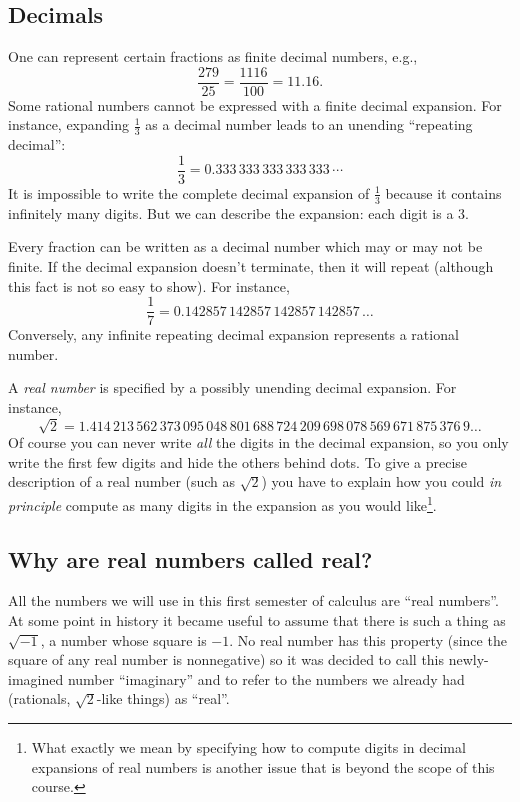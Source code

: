 \subsection{Decimals} 
One can represent certain fractions as finite decimal numbers, e.g.,
\[
\frac{279}{25}= \frac{1116}{100} = 11.16.
\]
Some rational numbers cannot be expressed with a finite decimal expansion.  For instance,
expanding $\frac13$ as a decimal number leads to an unending ``repeating decimal'':
\[
\frac13 = 0.333\,333\,333\,333\,333\,\cdots
\]
It is impossible to write the complete decimal expansion of $\frac13$
because it contains infinitely many digits.  But we can describe the
expansion: each digit is a 3.


Every fraction can be written as a decimal number which may or may
not be finite.  If the decimal expansion doesn't terminate, then it will
repeat (although this fact is not so easy to show).  For instance,
\[
\frac17 = 0.142857\,142857\,142857\,142857\,\dots
\]
Conversely, any infinite repeating decimal expansion represents a
rational number.


A \emph{real number} is specified by a possibly unending decimal
expansion.  For instance,
\[
\sqrt 2 = 1.414\,213\,562\,373\,095\,048\,801\,688\,724\,
209\,698\,078\,569\,671\,875\,376\,9\dots
\]
Of course you can never write \textit{all} the digits in the decimal expansion,
so you only write the first few digits and hide the others behind dots. To
give a precise description of a real number (such as $\sqrt2$) you have to
explain how you could \textit{in principle} compute as many digits in the
expansion as you would like\footnote{What exactly we mean by specifying how to compute digits in decimal expansions of real numbers is another issue that is beyond the scope of this course.}.


\subsection{Why are real numbers called real? } 
All the numbers we will use in this first semester of calculus are ``real
numbers''. At some point in history it became useful to assume that there
is such a thing as $\sqrt{-1}$, a number whose square is $-1$.  No
real number has this property (since the square of any real number is
nonnegative) so it was decided to call this newly-imagined number ``imaginary''
and to refer to the numbers we already had (rationals, $\sqrt2$-like
things) as ``real''.


